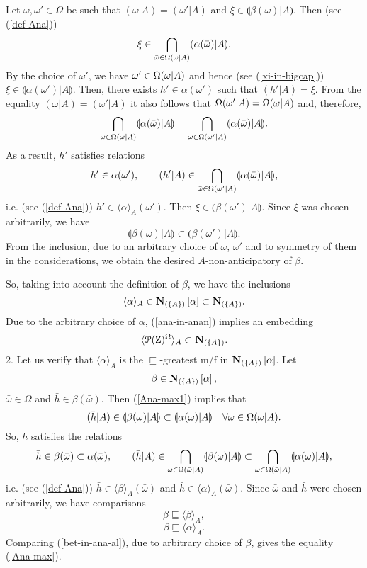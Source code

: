 \documentclass[sn-mathphys,Numbered,pdflatex]{sn-jnl}%
\theoremstyle{thmstyleone}%
\theoremstyle{thmstyletwo}%
\theoremstyle{thmstylethree}%
\newcommand{\beq}{\begin{equation}}
\newcommand{\eeq}{\end{equation}}
\newcommand{\icP}[1]{\EuScript{P}({#1})}%
\newcommand{\res}[2]{\ensuremath{(#1|#2)}}%
\newcommand{\myLe}{\mathrel{\sqsubseteq}}%
\newcommand{\naOm}{\ensuremath{\Omega}}%
\newcommand{\naZ}{\ensuremath{\mathrm{Z}}}%
\newcommand{\naOmo}[2]{\naOm\setbox0=\hbox{\text{$#1$}}\ifdim\wd0=0pt\else\res{#1}{#2}\fi}%
\newcommand{\AnaN}[2]{\mathbf{N}_{(#1)}\setbox0=\hbox{\text{$#2$}}\ifdim\wd0=0pt\else\left[{#2}\right]\fi}%
\newcommand{\sres}[2]{\llparenthesis#1|#2\rrparenthesis}%
\newcommand{\Ana}[2]{\ensuremath{\langle{#1}\rangle_{#2}}}%
\newcommand{\fref}[1]{{\rm(\ref{#1})}}   %
\begin{document}
Let $\omega,\omega'\in\naOm$ be such that $\res\omega A=\res{\omega'}A$ and $\xi\in\sres{\beta(\omega)}A $.
Then (see \fref{def-Ana})
\beq\label{xi-in-bigcap}
\xi\in\bigcap_{\bar\omega\in\naOmo\omega A}\sres{\alpha(\bar\omega)}A.
\eeq
By the choice of $\omega'$, we have $\omega'\in\naOmo\omega A$ and hence (see \fref{xi-in-bigcap}) $\xi\in\sres{\alpha(\omega')}A$.
Then, there exists $h'\in\alpha(\omega')$ such that $\res{h'}A=\xi$.
From the equality $\res\omega A=\res{\omega'}A$ it also follows that $\naOmo{\omega'} A=\naOmo\omega A$ and, therefore,
$$
\bigcap_{\bar\omega\in\naOmo\omega A}\sres{\alpha(\bar\omega)}A=\bigcap_{\bar\omega\in\naOmo{\omega'} A}\sres{ \alpha(\bar\omega)}A.
$$
As a result, $h'$ satisfies relations
$$
h'\in\alpha(\omega'),\qquad\res{h'}A\in\bigcap_{\bar\omega\in\naOmo{\omega'} A}\sres{\alpha(\bar\omega)}A,
$$
i.e. (see \fref{def-Ana}) $h'\in\Ana{\alpha}{A}(\omega')$.
Then $\xi\in\sres{\beta(\omega')}A$.
Since $\xi$ was chosen arbitrarily, we have
$$
\sres{\beta(\omega)}A\subset\sres{\beta(\omega')}A.
$$
From the inclusion, due to an arbitrary choice of $\omega$, $\omega'$ and to symmetry of them in the considerations, we obtain the desired $A$-non-anticipatory of $\beta$.

So, taking into account the definition of $\beta$, we have the inclusions
\beq\label{ana-in-anan}
\Ana{\alpha}{A}\in\AnaN{\{A\}}\alpha\subset\AnaN{\{A\}}{}.
\eeq
Due to the arbitrary choice of $\alpha$, \fref{ana-in-anan} implies an embedding
\beq\label{anaZO-in-NA}
\Ana{\icP\naZ^\naOm}{A}\subset\AnaN{\{A\}}{}.
\eeq
2.
Let us verify that $\Ana{\alpha}{A}$ is the $\myLe$-greatest m/f in $\AnaN{\{A\}}\alpha$.
Let
\beq\label{Ana-max1}
\beta\in\AnaN{\{A\}}\alpha,
\eeq
$\bar\omega\in\naOm$ and $\bar h\in\beta(\bar\omega)$.
Then \fref{Ana-max1} implies that
$$
\res{\bar h}A\in\sres{\beta(\omega)}A\subset\sres{\alpha(\omega)}A\quad\forall\omega\in\naOmo{\bar\omega} A.
$$
So, $\bar h$ satisfies the relations
$$
\bar h\in\beta(\bar\omega)\subset\alpha(\bar\omega),\qquad\res{\bar h}A\in\bigcap_{\omega\in\naOmo{\bar\omega } A}\sres{\beta(\omega)}A\subset\bigcap_{\omega\in\naOmo{\bar\omega } A}\sres{\alpha(\omega)}A,
$$
i.e. (see \fref{def-Ana}) $\bar h\in\Ana{\beta}{A}(\bar\omega)$ and $\bar h\in\Ana{\alpha}{A }(\bar\omega)$.
Since $\bar\omega$ and $\bar h$ were chosen arbitrarily, we have comparisons
\beq\label{bet-in-ana-bet}
\beta\myLe\Ana{\beta}{A},
\eeq
\beq\label{bet-in-ana-al}
\beta\myLe\Ana{\alpha}{A}.
\eeq
Comparing \fref{bet-in-ana-al}, due to arbitrary choice of $\beta$, gives the equality \fref{Ana-max}.
\end{document}

